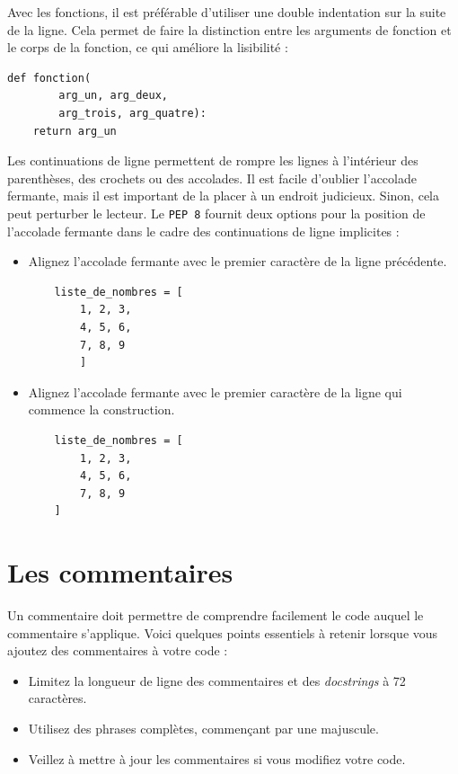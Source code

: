 \documentclass[a4paper,12pt]{book}
\begin{document}
Avec les fonctions, il est préférable d'utiliser une double indentation sur la suite de la ligne. Cela permet de faire la distinction entre les arguments de fonction et le corps de la fonction, ce qui améliore la lisibilité :
\begin{lstlisting}
def fonction(
        arg_un, arg_deux,
        arg_trois, arg_quatre):
    return arg_un
\end{lstlisting}
\medskip

Les continuations de ligne permettent de rompre les lignes à l'intérieur des parenthèses, des crochets ou des accolades. Il est facile d'oublier l'accolade fermante, mais il est important de la placer à un endroit judicieux. Sinon, cela peut perturber le lecteur. Le \texttt{PEP 8} fournit deux options pour la position de l'accolade fermante dans le cadre des continuations de ligne implicites :
\begin{itemize}
	\item Alignez l'accolade fermante avec le premier caractère de la ligne précédente.
	\begin{lstlisting}
	liste_de_nombres = [
        1, 2, 3,
        4, 5, 6,
        7, 8, 9
        ]
	\end{lstlisting}
	\item Alignez l'accolade fermante avec le premier caractère de la ligne qui commence la construction.
	\begin{lstlisting}
	liste_de_nombres = [
        1, 2, 3,
        4, 5, 6,
        7, 8, 9
    ]
	\end{lstlisting}
\end{itemize}
\medskip

\section{Les commentaires}
Un commentaire doit permettre de comprendre facilement le code auquel le commentaire s'applique. Voici quelques points essentiels à retenir lorsque vous ajoutez des commentaires à votre code :
\begin{itemize}
	\item Limitez la longueur de ligne des commentaires et des \textit{docstrings} à 72 caractères.
    \item Utilisez des phrases complètes, commençant par une majuscule.
    \item Veillez à mettre à jour les commentaires si vous modifiez votre code.
\end{itemize}
\medskip
\end{document}
